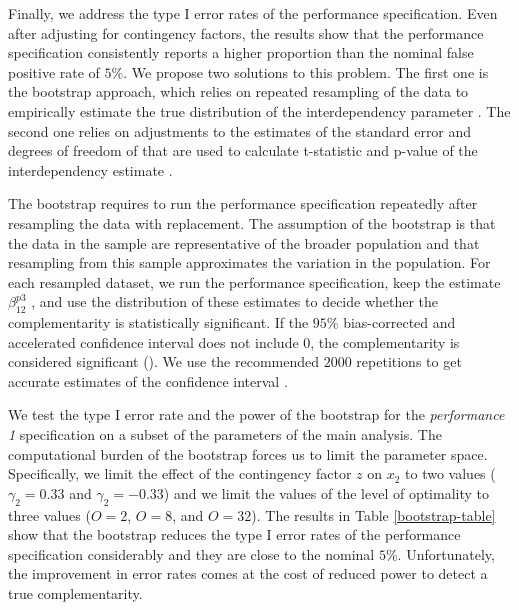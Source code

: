 \documentclass[12pt]{article}
\begin{document}
Finally, we address the type I error rates of the performance specification. Even after adjusting for contingency factors, the results show that the performance specification consistently reports a higher proportion than the nominal false positive rate of $5\%$. We propose two solutions to this problem. The first one is the bootstrap approach, which relies on repeated resampling of the data to empirically estimate the true distribution of the interdependency parameter \citep{efron_computer_2017}. The second one relies on adjustments to the estimates of the standard error and degrees of freedom of that are used to calculate t-statistic and p-value of the interdependency estimate \citep{young_improved_2016}.

The bootstrap requires to run the performance specification repeatedly after resampling the data with replacement. The assumption of the bootstrap is that the data in the sample are representative of the broader population and that resampling from this sample approximates the variation in the population. For each resampled dataset, we run the performance specification, keep the estimate $\beta_{12}^{p3}$ , and use the distribution of these estimates to decide whether the complementarity is statistically significant. If the $95\%$ bias-corrected and accelerated confidence interval does not include $0$, the complementarity is considered significant (\citep{efron_computer_2017}). We use the recommended $2000$ repetitions to get accurate estimates of the confidence interval \citep{efron_computer_2017}. 

We test the type I error rate and the power of the bootstrap for the \emph{performance 1} specification on a subset of the parameters of the main analysis. The computational burden of the bootstrap forces us to limit the parameter space. Specifically, we limit the effect of the contingency factor $z$ on $x_2$ to two values ($\gamma_2 = 0.33$ and $\gamma_2 = -0.33$) and we limit the values of the level of optimality to three values ($O=2$, $O=8$, and $O=32$). The results in Table \ref{bootstrap-table} show that the bootstrap reduces the type I error rates of the performance specification considerably and they are close to the nominal $5\%$.  Unfortunately, the improvement in error rates comes at the cost of reduced power to detect a true complementarity.


\end{document}
